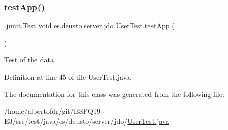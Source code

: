 \subsubsection{\texorpdfstring{test\+App()}{testApp()}}
{\footnotesize\ttfamily .junit.\+Test void es.\+deusto.\+server.\+jdo.\+User\+Test.\+test\+App (\begin{DoxyParamCaption}{ }\end{DoxyParamCaption})}

Test of the data 

Definition at line 45 of file User\+Test.\+java.



The documentation for this class was generated from the following file\+:\begin{DoxyCompactItemize}
\item 
/home/albertofdr/git/\+B\+S\+P\+Q19-\/\+E3/src/test/java/es/deusto/server/jdo/\hyperlink{_user_test_8java}{User\+Test.\+java}\end{DoxyCompactItemize}
